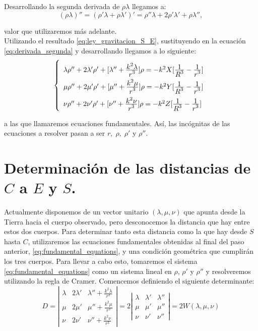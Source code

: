 Desarrollando la segunda derivada de $\rho\lambda$ llegamos a:
\[
(\rho\lambda)''=(\rho'\lambda+\rho\lambda')'=\rho''\lambda+2\rho'\lambda'+\rho\lambda'',
\]

\noindent valor que utilizaremos más adelante.\\

Utilizando el resultado \eqref{eq:ley_gravitacion_S_E}, sustituyendo en la ecuación \eqref{eq:derivada_segunda} y desarrollando llegamos a lo siguiente:
\begin{align}
\left\{
\def\arraystretch{2}
\begin{array}{l}
	\lambda\rho''+2\lambda'\rho'+[\lambda''+\ddfrac{k^2\lambda}{r^3}]\rho=-k^2X[\ddfrac{1}{R^3}-\ddfrac{1}{r^3}]\\
	\mu\rho''+2\mu'\rho'+[\mu''+\ddfrac{k^2\mu}{r^3}]\rho=-k^2Y[\ddfrac{1}{R^3}-\ddfrac{1}{r^3}]\\
	\nu\rho''+2\nu'\rho'+[\nu''+\ddfrac{k^2\nu}{r^3}]\rho=-k^2Z[\ddfrac{1}{R^3}-\ddfrac{1}{r^3}]
\end{array}
\right.
\label{eq:fundamental_equations}
\end{align}

\noindent a las que llamaremos ecuaciones fundamentales. Así, las incógnitas de las ecuaciones a resolver pasan a ser $r, \; \rho, \; \rho'$ y $\rho''$. \cite{moulton}\\



\section{Determinación de las distancias de $C$ a $E$ y $S$.}
\label{sec:distancias}
Actualmente disponemos de un vector unitario $(\lambda,\mu,\nu)$ que apunta desde la Tierra hacia el cuerpo observado, pero desconocemos la distancia que hay entre estos dos cuerpos. Para determinar tanto esta distancia como la que hay desde $S$ hasta $C$, utilizaremos las ecuaciones fundamentales obtenidas al final del paso anterior, \eqref{eq:fundamental_equations}, y una condición geométrica que cumplirán los tres cuerpos. Para llevar a cabo esto, tomaremos el sistema \eqref{eq:fundamental_equations} como un sistema lineal en $\rho$, $\rho'$ y $\rho''$ y resolveremos utilizando la regla de Cramer. Comencemos definiendo el siguiente determinante:
\[
D =
\left|
\begin{array}{ccc}
	\lambda & 2\lambda' & \lambda''+\frac{k^2\lambda}{r^3}\\
	\mu & 2\mu' & \mu''+\frac{k^2\mu}{r^3}\\
	\nu & 2\nu' & \nu''+\frac{k^2\nu}{r^3}
\end{array}
\right|
=
2
\left|
\begin{array}{ccc}
	\lambda & \lambda' & \lambda''\\
	\mu & \mu' & \mu''\\
	\nu & \nu' & \nu''
\end{array}
\right|
=2W(\lambda,\mu,\nu)
\]

